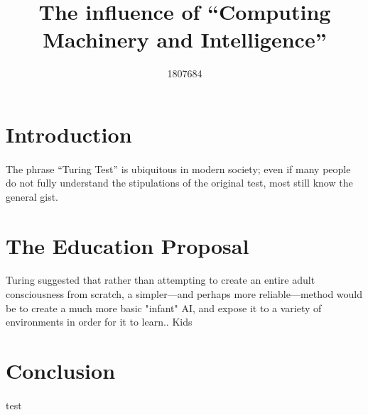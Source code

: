 \documentclass{scrartcl}
\title{The influence of “Computing Machinery and Intelligence”}
\author{1807684}
\begin{document}
\maketitle

\section{Introduction}
\paragraph{}
The phrase “Turing Test” is ubiquitous in modern society; even if many people do not fully understand the stipulations of the original test, most still know the general gist.

\section{The Education Proposal}
\paragraph{}  %
Turing suggested that rather than attempting to create an entire adult consciousness from scratch, a simpler—and perhaps more reliable—method would be to create a much more basic "infant" AI, and expose it to a variety of environments in order for it to learn..
Kids\cite{Infants}

\section{Conclusion}
\paragraph{}
test \cite{Main}



\end{document}
